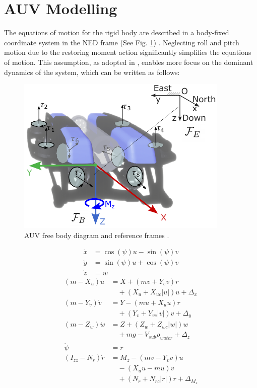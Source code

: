 \section{AUV Modelling}
\label{sec:model}


The equations of motion for the rigid body are described in a body-fixed coordinate system in the \ac{NED} frame (See Fig. \ref{fig:rov}) \cite{fossen}. Neglecting roll and pitch motion due to the restoring moment action significantly simplifies the equations of motion. This assumption, as adopted in \cite{shen2018path, heshmati2019robust}, enables more focus on the dominant dynamics of the system, which can be written as follows:

\begin{figure}[b!]
	\centering	\includegraphics[width=0.7\linewidth]{figures/Introduction/brov.pdf}
	\caption{\ac{AUV} free body diagram and reference frames \cite{unav}.}
	\label{fig:rov}
\end{figure}


\begin{align}
\dot{x} &= \cos(\psi) u - \sin(\psi)  v \label{eq:xdot}\\
\dot{y} &= \sin(\psi)  u + \cos(\psi)  v \label{eq:ydot}\\
\dot{z} &= w \label{eq:zdot}
\end{align}
\begin{align}
(m - X_{\dot{u}})\dot{u} &= X + (m  v + Y_{\dot{v}}  v)  r \nonumber \\
&\quad + (X_u + X_{uc}  |u| )  u + \Delta_{x} \label{eq:udot}\\
(m - Y_{\dot{v}})\dot{v} &= Y - (m  u + X_{\dot{u}}  u)  r \nonumber \\
&\quad + (Y_v + Y_{vc}  |v|)  v + \Delta_{y} \label{eq:vdot}\\
(m - Z_{\dot{w}}) \dot{w} &= Z + (Z_w + Z_{wc}  |w|)w \nonumber \\
&\quad + m  g - V_{sub} \rho_{water}  + \Delta_{z}\label{eq:wdot}\\
\dot{\psi} &= r \label{eq:psidot}\\
(I_{zz} - N_{\dot{r}}) \dot{r} &= M_z - (m  v - Y_{\dot{v}}  v)  u \nonumber \\
&\quad - (X_{\dot{u}}  u - m  u)  v  \nonumber \\
&\quad + (N_r + N_{rc}  |r|)  r + \Delta_{M_z} \label{eq:rdot}
\end{align}

